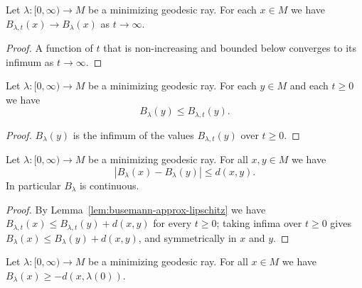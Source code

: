 \begin{lemma}
\label{lem:busemann-limit}
\leanok
{}
Let $\lambda\colon [0,\infty)\to M$ be a minimizing geodesic ray.
For each $x\in M$ we have $B_{\lambda,t}(x)\rightarrow B_\lambda(x)$
as $t\rightarrow\infty$.
\end{lemma}

\begin{proof}
\leanok
{}
A function of $t$ that is non-increasing and bounded below converges
to its infimum as $t\rightarrow\infty$.
\end{proof}

\begin{lemma}
\label{lem:busemann-le-approx}
\leanok
{}
Let $\lambda\colon [0,\infty)\to M$ be a minimizing geodesic ray.
For each $y\in M$ and each $t\ge 0$ we have
$$B_\lambda(y)\le B_{\lambda,t}(y).$$
\end{lemma}

\begin{proof}
\leanok
$B_\lambda(y)$ is the infimum of the values $B_{\lambda,t}(y)$ over
$t\ge 0$.
\end{proof}

\begin{lemma}
\label{lem:busemann-lipschitz}
\leanok
{}
Let $\lambda\colon [0,\infty)\to M$ be a minimizing geodesic ray.
For all $x,y\in M$ we have
$$|B_\lambda(x)-B_\lambda(y)|\le d(x,y).$$
In particular $B_\lambda$ is continuous.
\end{lemma}

\begin{proof}
\leanok
{}
By Lemma~\ref{lem:busemann-approx-lipschitz} we have
$B_{\lambda,t}(x)\le B_{\lambda,t}(y)+d(x,y)$ for every $t\ge 0$;
taking infima over $t\ge 0$ gives $B_\lambda(x)\le
B_\lambda(y)+d(x,y)$, and symmetrically in $x$ and $y$.
\end{proof}

\begin{lemma}
\label{lem:busemann-lower-bound}
\leanok
{}
Let $\lambda\colon [0,\infty)\to M$ be a minimizing geodesic ray.
For all $x\in M$ we have $B_\lambda(x)\ge -d(x,\lambda(0))$.
\end{lemma}

